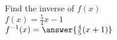 \documentclass{ximera}
\author{David Kish}
\begin{document}
\begin{exercise}
Find the inverse of $f(x)$\\
$f(x)= \frac{5}{4}x-1$\\
$f^{-1}(x)=\answer{\frac{4}{5}(x+1)}$\\
\end{exercise}
\end{document}
